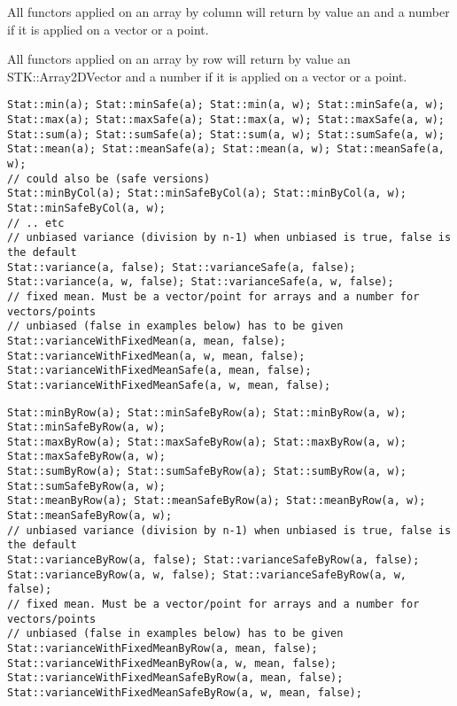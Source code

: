 \documentclass[a4paper,10pt]{article}
\begin{document}
All functors applied on an array by column will return by value an
 and a number if it is applied on a vector or a point.

All functors applied on an array by row will return by value an STK::Array2DVector
and a number if it is applied on a vector or a point.

\begin{lstlisting}[style=customcpp,caption=Functors by column]
Stat::min(a); Stat::minSafe(a); Stat::min(a, w); Stat::minSafe(a, w);
Stat::max(a); Stat::maxSafe(a); Stat::max(a, w); Stat::maxSafe(a, w);
Stat::sum(a); Stat::sumSafe(a); Stat::sum(a, w); Stat::sumSafe(a, w);
Stat::mean(a); Stat::meanSafe(a); Stat::mean(a, w); Stat::meanSafe(a, w);
// could also be (safe versions)
Stat::minByCol(a); Stat::minSafeByCol(a); Stat::minByCol(a, w); Stat::minSafeByCol(a, w);
// .. etc
// unbiased variance (division by n-1) when unbiased is true, false is the default
Stat::variance(a, false); Stat::varianceSafe(a, false);
Stat::variance(a, w, false); Stat::varianceSafe(a, w, false);
// fixed mean. Must be a vector/point for arrays and a number for vectors/points
// unbiased (false in examples below) has to be given
Stat::varianceWithFixedMean(a, mean, false);
Stat::varianceWithFixedMean(a, w, mean, false);
Stat::varianceWithFixedMeanSafe(a, mean, false);
Stat::varianceWithFixedMeanSafe(a, w, mean, false);
\end{lstlisting}


\begin{lstlisting}[style=customcpp,caption=Functors by row]
Stat::minByRow(a); Stat::minSafeByRow(a); Stat::minByRow(a, w); Stat::minSafeByRow(a, w);
Stat::maxByRow(a); Stat::maxSafeByRow(a); Stat::maxByRow(a, w); Stat::maxSafeByRow(a, w);
Stat::sumByRow(a); Stat::sumSafeByRow(a); Stat::sumByRow(a, w); Stat::sumSafeByRow(a, w);
Stat::meanByRow(a); Stat::meanSafeByRow(a); Stat::meanByRow(a, w); Stat::meanSafeByRow(a, w);
// unbiased variance (division by n-1) when unbiased is true, false is the default
Stat::varianceByRow(a, false); Stat::varianceSafeByRow(a, false);
Stat::varianceByRow(a, w, false); Stat::varianceSafeByRow(a, w, false);
// fixed mean. Must be a vector/point for arrays and a number for vectors/points
// unbiased (false in examples below) has to be given
Stat::varianceWithFixedMeanByRow(a, mean, false);
Stat::varianceWithFixedMeanByRow(a, w, mean, false);
Stat::varianceWithFixedMeanSafeByRow(a, mean, false);
Stat::varianceWithFixedMeanSafeByRow(a, w, mean, false);
\end{lstlisting}
\end{document}
